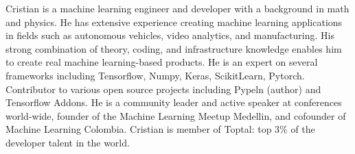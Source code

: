 \small{Cristian is a machine learning engineer and developer with a background in math and physics. He has extensive experience creating machine learning applications in fields such as autonomous vehicles, video analytics, and manufacturing. His strong combination of theory, coding, and infrastructure knowledge enables him to create real machine learning-based products. He is an expert on several frameworks including Tensorflow, Numpy, Keras, ScikitLearn, Pytorch. Contributor to various open source projects including Pypeln (author) and Tensorflow Addons. He is a community leader and active speaker at conferences world-wide, founder of the Machine Learning Meetup Medellin, and cofounder of Machine Learning Colombia. Cristian is member of Toptal: top 3\% of the developer talent in the world.}
